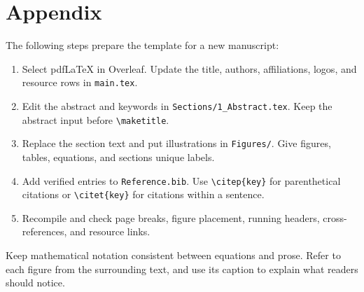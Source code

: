 \section{Appendix}
\label{app:example}

The following steps prepare the template for a new manuscript:
\begin{enumerate}
  \item Select pdfLaTeX in Overleaf. Update the title, authors, affiliations, logos, and resource rows in \texttt{main.tex}.
  \item Edit the abstract and keywords in \texttt{Sections/1\_Abstract.tex}. Keep the abstract input before \verb|\maketitle|.
  \item Replace the section text and put illustrations in \texttt{Figures/}. Give figures, tables, equations, and sections unique labels.
  \item Add verified entries to \texttt{Reference.bib}. Use \verb|\citep{key}| for parenthetical citations or \verb|\citet{key}| for citations within a sentence.
  \item Recompile and check page breaks, figure placement, running headers, cross-references, and resource links.
\end{enumerate}

Keep mathematical notation consistent between equations and prose. Refer to each figure from the surrounding text, and use its caption to explain what readers should notice.
